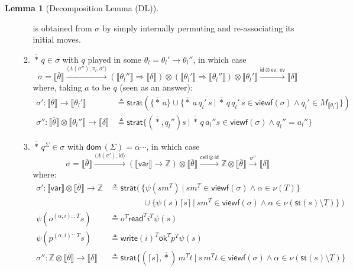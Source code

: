 \documentclass{CSML}
\theoremstyle{definition}\newtheorem{definition}[thm]{Definition}
\theoremstyle{definition}\newtheorem{example}[thm]{Example}
\theoremstyle{definition}\newtheorem{proposition}[thm]{Proposition}
\theoremstyle{definition}\newtheorem{lemma}[thm]{Lemma}
\theoremstyle{definition}\newtheorem{theorem}[thm]{Theorem}
\theoremstyle{definition}\newtheorem{corollary}[thm]{Corollary}
\theoremstyle{definition}\newtheorem{remark}[thm]{Remark}
\newcommand\ev{\mathsf{ev}}
\newcommand\app{\ev}
\renewcommand\Sigma{\varSigma}
\newcommand\Tau{T}
\newcommand\defn{\triangleq}
\newcommand\arr{\rightarrow}
\newcommand\Arr{\Rightarrow}
\newcommand\remv{\setminus}
\newcommand\code[1]{\lceil#1\rceil}
\newcommand\ang[1]{\langle#1\rangle}
\newcommand\id{\mathsf{id}}
\newcommand\cell{\mathsf{cell}}
\newcommand\ok{\mathsf{ok}}
\newcommand\rd{\mathsf{read}}
\newcommand\viewf{\mathsf{viewf}}
\newcommand\strat{\mathsf{strat}}
\newcommand\st[1]{\mathsf{st}(#1)}
\newcommand\Z{\mathbb{Z}}
\newcommand\dom[1]{\mathsf{dom}\,#1}
\newcommand\mwrite[1]{\mathsf{write}(#1)}
\newcommand\vart{\mathsf{var}}
\newcommand{\rarr}{\rightarrow}
\newcommand\sem[1]{\llbracket #1 \rrbracket}
\newcommand\na\alpha
\begin{document}
\begin{lemma}[Decomposition Lemma (DL)]
\begin{enumerate}[label=\bf\arabic*.]
\begin{enumerate}[label=\bf\arabic*.,start=6]
\[\] is obtained from $\sigma$ by simply internally permuting and re-associating its initial moves.
  \item $\overline{*}\,q\in\sigma$ with $q$ played in some $\theta_l=\theta_{l}'\arr \theta_{l}''$, in which case
    \[ \sigma=\sem{\overline{\theta}}\xrightarrow{\ang{\Lambda(\sigma''),\pi_l,\sigma'}}(\sem{\theta_l''}\Arr \sem{\delta})\otimes(\sem{\theta_l'}\Arr\sem{\theta_l''})\otimes \sem{\theta_l'}\xrightarrow{\id\otimes\app;\,\app}\sem{\delta} \]
    where, taking $a$ to be $q$ (seen as an answer):
    \begin{align*}
      \sigma':\sem{\overline{\theta}}\arr\sem{\theta_l'}
&\defn\strat(\{\overline{*}\,a\}\cup\{\overline{*}\,a\,q_l'\,s\ |\ \overline{*}\,q\,q_l'\,s\in\viewf(\sigma)\land q_l'\in M_{\sem{\theta_l'}}\}) \\
      \sigma'':\sem{\overline{\theta}}\otimes\sem{\theta_l''}\arr \sem{\delta} &\defn \strat\{(\overline{*},q_l'')s\ |\ \overline{*}\,q\,a_l'' s\in\viewf(\sigma)\land q_l''=a_l'' \}
    \end{align*}
  \item $\overline{*}\,q^\Sigma\in\sigma$ with $\dom(\Sigma)=\na\cdots$, in which case
    \[ \sigma=\sem{\overline{\theta}}\xrightarrow{\ang{\Lambda(\sigma'),\id}}(\sem{\vart}\rarr\Z)\otimes\sem{\overline{\theta}}\xrightarrow{\cell\otimes\id}
    \Z\otimes\sem{\overline{\theta}}
    \xrightarrow{\sigma''}\sem{\delta}\]
    where:
    \begin{align*}
        \sigma':\sem{\vart}\otimes\sem{\overline{\theta}}\arr\Z &\defn\strat(\,\{\psi(sm^\Tau)\ |\ sm^\Tau\in\viewf(\sigma)\land\na\in\nu(\Tau)\} \\
        &\qquad\qquad\cup \{\psi(s)\code{s}\ |\ sm^\Tau\in\viewf(\sigma)\land\na\in\nu(\st{s}\remv\Tau)\}\,) \\
        \psi(o^{(\na,i)::\Tau} s)&\defn o^\Tau \rd^\Tau i^\Tau\psi(s) \\
        \psi(p^{(\na,i)::\Tau} s)&\defn \mwrite{i}^\Tau \ok^\Tau p^\Tau\psi(s) \\
        \sigma'':\Z\otimes\sem{\overline{\theta}}\arr\sem{\delta} &\defn \strat\{(\code{s},\overline{*})\,m^\Tau t\ |\ s\,m^\Tau t\in\viewf(\sigma)\land\na\in\nu(\st{s}\remv\Tau) \}
    \end{align*}
  \end{enumerate}
\end{enumerate}
\end{lemma}
\end{document}
